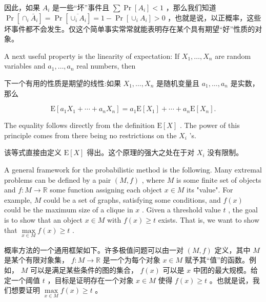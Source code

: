\documentclass[10pt]{article}
\begin{document}
\begin{tcolorbox}\relax
因此，如果 \({A}_{i}\) 是一些“坏”事件且 \(\sum \Pr \left\lbrack  {A}_{i}\right\rbrack   < 1\) ，那么我们知道 \(\Pr \left\lbrack  {{ \cap  }_{i}{\bar{A}}_{i}}\right\rbrack   = \Pr \left\lbrack  \overline{{ \cup  }_{i}{A}_{i}}\right\rbrack   = 1 - \Pr \left\lbrack  {{ \cup  }_{i}{A}_{i}}\right\rbrack   > 0\) ，也就是说，以正概率，这些坏事件都不会发生。仅这个简单事实常常就能表明存在某个具有期望“好”性质的对象。
\end{tcolorbox}

A next useful property is the linearity of expectation: If \({X}_{1},\ldots ,{X}_{n}\) are random variables and \({a}_{1},\ldots ,{a}_{n}\) real numbers, then

\begin{tcolorbox}\relax
下一个有用的性质是期望的线性:如果 \({X}_{1},\ldots ,{X}_{n}\) 是随机变量且 \({a}_{1},\ldots ,{a}_{n}\) 是实数，那么
\end{tcolorbox}

\[
\mathrm{E}\left\lbrack  {{a}_{1}{X}_{1} + \cdots  + {a}_{n}{X}_{n}}\right\rbrack   = {a}_{1}\mathrm{E}\left\lbrack  {X}_{1}\right\rbrack   + \cdots  + {a}_{n}\mathrm{E}\left\lbrack  {X}_{n}\right\rbrack  .
\]

The equality follows directly from the definition \(\mathrm{E}\left\lbrack  X\right\rbrack\) . The power of this principle comes from there being no restrictions on the \({X}_{i}\) ’s.

\begin{tcolorbox}\relax
该等式直接由定义 \(\mathrm{E}\left\lbrack  X\right\rbrack\) 得出。这个原理的强大之处在于对 \({X}_{i}\) 没有限制。
\end{tcolorbox}

A general framework for the probabilistic method is the following. Many extremal problems can be defined by a pair \(\left( {M,f}\right)\) , where \(M\) is some finite set of objects and \(f : M \rightarrow  \mathbb{R}\) some function assigning each object \(x \in  M\) its "value". For example, \(M\) could be a set of graphs, satisfying some conditions, and \(f\left( x\right)\) could be the maximum size of a clique in \(x\) . Given a threshold value \(t\) , the goal is to show that an object \(x \in  M\) with \(f\left( x\right)  \geq  t\) exists. That is, we want to show that \(\mathop{\max }\limits_{{x \in  M}}f\left( x\right)  \geq  t\) .

\begin{tcolorbox}\relax
概率方法的一个通用框架如下。许多极值问题可以由一对 \(\left( {M,f}\right)\) 定义，其中 \(M\) 是某个有限对象集， \(f : M \rightarrow  \mathbb{R}\) 是一个为每个对象 \(x \in  M\) 赋予其“值”的函数。例如， \(M\) 可以是满足某些条件的图的集合， \(f\left( x\right)\) 可以是 \(x\) 中团的最大规模。给定一个阈值 \(t\) ，目标是证明存在一个对象 \(x \in  M\) 使得 \(f\left( x\right)  \geq  t\) 。也就是说，我们想要证明 \(\mathop{\max }\limits_{{x \in  M}}f\left( x\right)  \geq  t\) 。
\end{tcolorbox}
\end{document}
